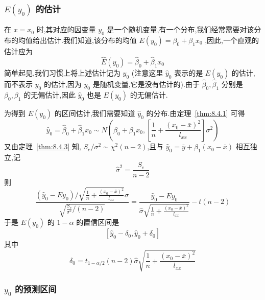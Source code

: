 \subsubsection{$E(y_0)$ 的估计}


在 $x=x_0$ 时,其对应的因变量 $y_0$ 是一个随机变量,有一个分布,我们经常需要对该分布的均值给出估计.我们知道,该分布的均值 $E(y_0)=\beta_0+\beta_1x_0$ ,因此,一个直观的估计应为
\begin{equation*}
\hat{E}(y_{0})=\hat{\beta}_0+\hat{\beta}_1 x_0
\end{equation*}
简单起见,我们习惯上将上述估计记为 $\hat{y}_0$ (注意这里 $\hat{y}_0$ 表示的是 $E(y_0)$ 的估计,而不表示 $y_0$ 的估计,因为 $y_0$ 是随机变量,它是没有估计的).由于 $\hat{\beta}_0,\hat{\beta}_1$ 分别是 $\beta_0,\beta_1$ 的无偏估计,因此 $\hat{y}_0$ 也是 $E(y_0)$ 的无偏估计.

为得到 $E(y_0)$ 的区间估计,我们需要知道 $\hat{y}_0$ 的分布.由定理~\ref{thm:8.4.1} 可得
\begin{equation*}
\hat{y}_{0}=\hat{\beta}_{0}+\hat{\beta}_{1} x_{0} \sim N\left(\beta_{0}+\beta_{1} x_{0},\left[\frac{1}{n}+\frac{\left(x_{0}-\bar{x}\right)^{2}}{l_{x x}}\right] \sigma^{2}\right)
\end{equation*}
又由定理~\ref{thm:8.4.3} 知, $S_{e} / \sigma^{2} \sim \chi^{2}(n-2)$,且与 $\hat{y}_{0}=\bar{y}+\hat{\beta}_{1}\left(x_{0}-\bar{x}\right)$ 相互独立,记
\begin{equation*}
\hat{\sigma}^2=\frac{S_e}{n-2}  
\end{equation*}
则
\begin{equation*}
\frac{\left(\hat{y}_{0}-E y_{0}\right) / \sqrt{\frac{1}{n}+\frac{\left(x_{0}-\bar{x}\right)^{2}}{l_{x x}}}\sigma }{\sqrt{\frac{S_{e}}{\sigma^{2}} /(n-2)}}=\frac{\hat{y}_{0}-E y_{0}}{\hat{\sigma} \sqrt{\frac{1}{n}+\frac{\left(x_{0}-\bar{x}\right)^{2}}{l_{x x}}}}-t(n-2)
\end{equation*}
于是 $E(y_0)$ 的 $1 - \alpha$ 的置信区间是
\begin{equation}\label{eq:8.4.20}
\left[ \hat{y}_0-\delta _0,\hat{y}_0+\delta _0 \right] 
\end{equation}
其中
\begin{equation}
\delta_{0}=t_{1-\alpha / 2}(n-2) \hat{\sigma} \sqrt{\frac{1}{n}+\frac{\left(x_{0}-\bar{x}\right)^{2}}{l_{x x}}}\label{eq:8.4.21}
\end{equation}

\subsubsection{$y_0$ 的预测区间}

